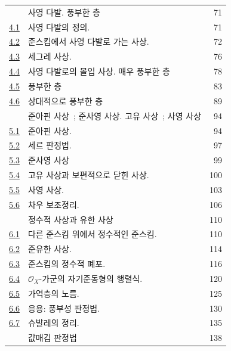 \begin{longtable}{@{}p{}p{}r@{}}
\hyperref[section:II.4-ko]{\textsection4} & 사영 다발. 풍부한 층 & 71\\
\hyperref[subsection:II.4.1-ko]{4.1} & 사영 다발의 정의. & 71\\
\hyperref[subsection:II.4.2-ko]{4.2} & 준스킴에서 사영 다발로 가는 사상. & 72\\
\hyperref[subsection:II.4.3-ko]{4.3} & 세그레 사상. & 76\\
\hyperref[subsection:II.4.4-ko]{4.4} & 사영 다발로의 몰입 사상. 매우 풍부한 층 & 78\\
\hyperref[subsection:II.4.5-ko]{4.5} & 풍부한 층 & 83\\
\hyperref[II.4.6-ko]{4.6} & 상대적으로 풍부한 층 & 89\\
\hyperref[section:II.5-ko]{\textsection5} & 준아핀 사상~; 준사영 사상. 고유 사상~; 사영 사상 & 94\\
\hyperref[subsection:II.5.1-ko]{5.1} & 준아핀 사상. & 94\\
\hyperref[subsection:II.5.2-ko]{5.2} & 세르 판정법. & 97\\
\hyperref[subsection:II.5.3-ko]{5.3} & 준사영 사상 & 99\\
\hyperref[subsection:II.5.4-ko]{5.4} & 고유 사상과 보편적으로 닫힌 사상. & 100\\
\hyperref[subsection:II.5.5-ko]{5.5} & 사영 사상. & 103\\
\hyperref[subsection:II.5.6-ko]{5.6} & 차우 보조정리. & 106\\
\hyperref[section:II.6-ko]{\textsection6} & 정수적 사상과 유한 사상 & 110\\
\hyperref[subsection:II.6.1-ko]{6.1} & 다른 준스킴 위에서 정수적인 준스킴. & 110\\
\hyperref[subsection:II.6.2-ko]{6.2} & 준유한 사상. & 114\\
\hyperref[subsection:II.6.3-ko]{6.3} & 준스킴의 정수적 폐포. & 116\\
\hyperref[subsection:II.6.4-ko]{6.4} & $\mathcal{O}_X$-가군의 자기준동형의 행렬식. & 120\\
\hyperref[subsection:II.6.5-ko]{6.5} & 가역층의 노름. & 125\\
\hyperref[subsection:II.6.6-ko]{6.6} & 응용: 풍부성 판정법. & 130\\
\hyperref[subsection:II.6.7-ko]{6.7} & 슈발레의 정리. & 135\\
\hyperref[section:II.7-ko]{\textsection7} & 값매김 판정법 & 138\\

\end{longtable}
